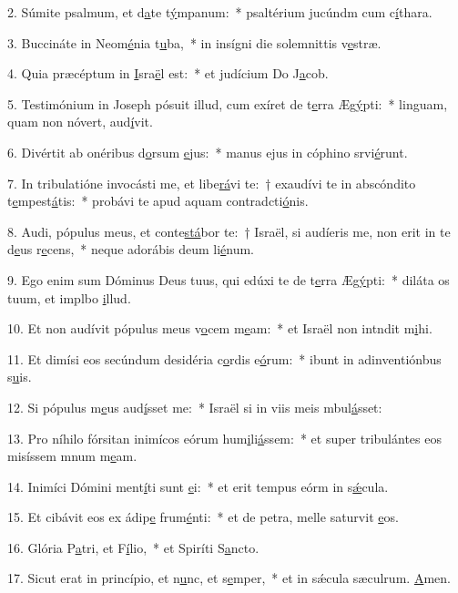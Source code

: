 2. Súmite psalmum, et d\uline{a}te t\uline{ý}mpanum:~* psaltérium jucúndm cum c\uline{í}thara.\par 
3. Buccináte in Neom\uline{é}nia t\uline{u}ba,~* in insígni die solemnittis v\uline{e}stræ.\par 
4. Quia præcéptum in \uline{I}sra\uline{ë}l est:~* et judícium Do J\uline{a}cob.\par 
5. Testimónium in Joseph pósuit illud, cum exíret de t\uline{e}rra Æg\uline{ý}pti:~* linguam, quam non nóvert, aud\uline{í}vit.\par 
6. Divértit ab onéribus d\uline{o}rsum \uline{e}jus:~* manus ejus in cóphino srvi\uline{é}runt.\par 
7. In tribulatióne invocásti me, et libe\uline{rá}vi te:~† exaudívi te in abscóndito t\uline{e}mpest\uline{á}tis:~* probávi te apud aquam contradcti\uline{ó}nis.\par 
8. Audi, pópulus meus, et conte\uline{stá}bor te:~† Israël, si audíeris me, non erit in te d\uline{e}us r\uline{e}cens,~* neque adorábis deum li\uline{é}num.\par 
9. Ego enim sum Dóminus Deus tuus, qui edúxi te de t\uline{e}rra Æg\uline{ý}pti:~* diláta os tuum, et implbo \uline{i}llud.\par 
10. Et non audívit pópulus meus v\uline{o}cem m\uline{e}am:~* et Israël non intndit m\uline{i}hi.\par 
11. Et dimísi eos secúndum desidéria c\uline{o}rdis e\uline{ó}rum:~* ibunt in adinventiónbus s\uline{u}is.\par 
12. Si pópulus m\uline{e}us aud\uline{í}sset me:~* Israël si in viis meis mbul\uline{á}sset:\par 
13. Pro níhilo fórsitan inimícos eórum hum\uline{i}li\uline{á}ssem:~* et super tribulántes eos misíssem mnum m\uline{e}am.\par 
14. Inimíci Dómini ment\uline{í}ti sunt \uline{e}i:~* et erit tempus eórm in s\uline{ǽ}cula.\par 
15. Et cibávit eos ex ádip\uline{e} frum\uline{é}nti:~* et de petra, melle saturvit \uline{e}os.\par 
16. Glória P\uline{a}tri, et F\uline{í}lio,~* et Spiríti S\uline{a}ncto.\par 
17. Sicut erat in princípio, et n\uline{u}nc, et s\uline{e}mper,~* et in sǽcula sæculrum. \uline{A}men.\par 
